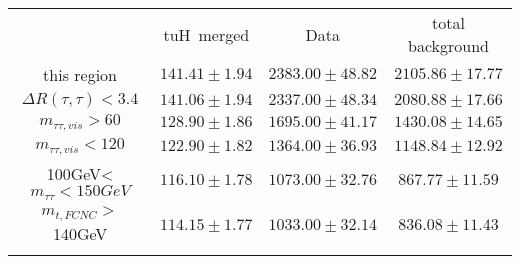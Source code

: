 \begin{tabular}{cccc} \toprule\toprule
 & tuH~merged & Data & total background\\
this region & $141.41\pm1.94$ & $2383.00\pm48.82$ & $2105.86\pm17.77$\\
$\Delta R(\tau,\tau)<3.4$ & $141.06\pm1.94$ & $2337.00\pm48.34$ & $2080.88\pm17.66$\\
$m_{\tau\tau,vis}>60$ & $128.90\pm1.86$ & $1695.00\pm41.17$ & $1430.08\pm14.65$\\
$m_{\tau\tau,vis}<120$ & $122.90\pm1.82$ & $1364.00\pm36.93$ & $1148.84\pm12.92$\\
100GeV<$m_{\tau\tau}<150GeV$ & $116.10\pm1.78$ & $1073.00\pm32.76$ & $867.77\pm11.59$\\
$m_{t,FCNC}>$140GeV & $114.15\pm1.77$ & $1033.00\pm32.14$ & $836.08\pm11.43$\\
\bottomrule\bottomrule\\
\end{tabular}
